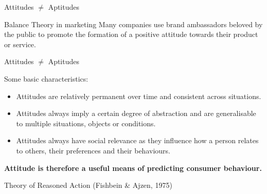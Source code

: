 \documentclass{beamer}
\begin{document}
\begin{frame}{Attitudes $\neq$ Aptitudes}
    \begin{block}{Balance Theory in marketing}
        Many companies use brand ambassadors beloved by the public to promote the formation of a positive attitude towards their product or service.  \\
        \vspace{0.5em}
        \centering
        \pause
    \end{block}
\end{frame}

\begin{frame}{Attitudes $\neq$ Aptitudes}
    \begin{block}{Some basic characteristics:}
        \small
        \begin{itemize}
            \item Attitudes are relatively permanent over time and consistent across situations.
            \item Attitudes always imply a certain degree of abstraction and are generalisable to multiple situations, objects or conditions.
            \item Attitudes always have social relevance as they influence how a person relates to others, their preferences and their behaviours.
        \end{itemize}
        \textbf{Attitude is therefore a useful means of predicting consumer behaviour.}
    \end{block}
\end{frame}


\begin{frame}{Theory of Reasoned Action (Fishbein \& Ajzen, 1975)}
\end{frame}
\end{document}
